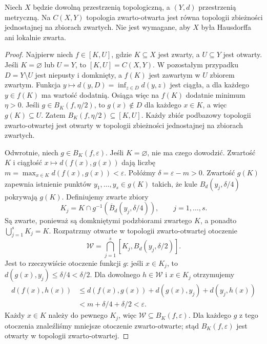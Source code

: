\begin{twierdzenie}
\label{thm:topog-odwzorowania-zwarto-otwarta-jednostajna}
Niech $X$ będzie dowolną przestrzenią
topologiczną, a $(Y,d)$ przestrzenią
metryczną. Na $C(X,Y)$ topologia
zwarto-otwarta jest równa topologii
zbieżności jednostajnej na zbiorach
zwartych. Nie jest wymagane, aby $X$
była Hausdorffa ani lokalnie zwarta.
\end{twierdzenie}
\begin{proof}
Najpierw niech $f\in[K,U]$,
gdzie $K\subseteq X$ jest zwarty,
a $U\subseteq Y$ jest otwarty.
Jeśli $K=\varnothing$ lub $U=Y$,
to $[K,U]=C(X,Y)$.
W pozostałym przypadku
$D=Y\setminus U$ jest niepusty
i domknięty, a $f(K)$ jest
zawartym w $U$ zbiorem zwartym.
Funkcja
$y\mapsto d(y,D)=\inf_{z\in D}d(y,z)$
jest ciągła, a dla każdego
$y\in f(K)$ ma wartość dodatnią.
Osiąga więc na $f(K)$ dodatnie
minimum $\eta>0$.
Jeśli $g\in B_K(f,\eta/2)$,
to $g(x)\notin D$ dla każdego
$x\in K$, a więc $g(K)\subseteq U$.
Zatem
$B_K(f,\eta/2)\subseteq[K,U]$.
Każdy zbiór podbazowy topologii
zwarto-otwartej jest otwarty
w topologii zbieżności jednostajnej
na zbiorach zwartych.

Odwrotnie, niech
$g\in B_K(f,\varepsilon)$.
Jeśli $K=\varnothing$, nie ma
czego dowodzić. Zwartość $K$
i ciągłość $x\mapsto d(f(x),g(x))$
dają liczbę
$m=\max_{x\in K}d(f(x),g(x))
<\varepsilon$.
Połóżmy $\delta=\varepsilon-m>0$.
Zwartość $g(K)$ zapewnia
istnienie punktów
$y_1,\ldots,y_s\in g(K)$
takich, że kule
$B_d(y_j,\delta/4)$ pokrywają
$g(K)$. Definiujemy zwarte zbiory
\[
K_j=K\cap
g^{-1}(\overline B_d(y_j,\delta/4)),
\qquad j=1,\ldots,s.
\]
Są zwarte, ponieważ są domkniętymi
podzbiorami zwartego $K$,
a ponadto $\bigcup_{j=1}^sK_j=K$.
Rozpatrzmy otwarte w topologii
zwarto-otwartej otoczenie
\[
\mathcal W=
\bigcap_{j=1}^s
[K_j,B_d(y_j,\delta/2)].
\]
Jest to rzeczywiście otoczenie
funkcji $g$: jeśli $x\in K_j$,
to $d(g(x),y_j)\le\delta/4<\delta/2$.
Dla dowolnego $h\in\mathcal W$
i $x\in K_j$ otrzymujemy
\[
\begin{split}
d(f(x),h(x))
&\le d(f(x),g(x))
+d(g(x),y_j)+d(y_j,h(x))\\
&<m+\delta/4+\delta/2
<\varepsilon.
\end{split}
\]
Każdy $x\in K$ należy do
pewnego $K_j$, więc
$\mathcal W\subseteq B_K(f,\varepsilon)$.
Dla każdego $g$ z tego otoczenia
znaleźliśmy mniejsze otoczenie
zwarto-otwarte; stąd
$B_K(f,\varepsilon)$ jest otwarty
w topologii zwarto-otwartej.
\end{proof}

